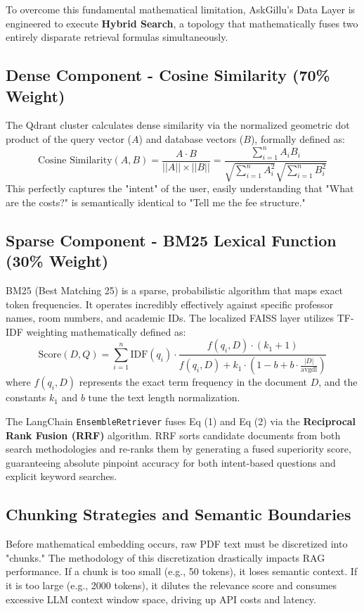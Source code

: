 \documentclass[12pt,a4paper]{report}
\begin{document}
To overcome this fundamental mathematical limitation, AskGillu's Data Layer is engineered to execute \textbf{Hybrid Search}, a topology that mathematically fuses two entirely disparate retrieval formulas simultaneously.

\subsection{Dense Component - Cosine Similarity (70\% Weight)}
The Qdrant cluster calculates dense similarity via the normalized geometric dot product of the query vector ($A$) and database vectors ($B$), formally defined as:
\begin{equation}
    \text{Cosine Similarity}(A, B) = \frac{A \cdot B}{||A|| \times ||B||} = \frac{\sum_{i=1}^{n} A_i B_i}{\sqrt{\sum_{i=1}^{n} A_i^2} \sqrt{\sum_{i=1}^{n} B_i^2}}
\end{equation}
This perfectly captures the "intent" of the user, easily understanding that "What are the costs?" is semantically identical to "Tell me the fee structure."

\subsection{Sparse Component - BM25 Lexical Function (30\% Weight)}
BM25 (Best Matching 25) is a sparse, probabilistic algorithm that maps exact token frequencies. It operates incredibly effectively against specific professor names, room numbers, and academic IDs. The localized FAISS layer utilizes TF-IDF weighting mathematically defined as:
\begin{equation}
    \text{Score}(D, Q) = \sum_{i=1}^{n} \text{IDF}(q_i) \cdot \frac{f(q_i, D) \cdot (k_1 + 1)}{f(q_i, D) + k_1 \cdot \left(1 - b + b \cdot \frac{|D|}{\text{avgdl}}\right)}
\end{equation}
where $f(q_i, D)$ represents the exact term frequency in the document $D$, and the constants $k_1$ and $b$ tune the text length normalization.

The LangChain \texttt{EnsembleRetriever} fuses Eq (1) and Eq (2) via the \textbf{Reciprocal Rank Fusion (RRF)} algorithm. RRF sorts candidate documents from both search methodologies and re-ranks them by generating a fused superiority score, guaranteeing absolute pinpoint accuracy for both intent-based questions and explicit keyword searches.

\subsection{Chunking Strategies and Semantic Boundaries}
Before mathematical embedding occurs, raw PDF text must be discretized into "chunks." The methodology of this discretization drastically impacts RAG performance. If a chunk is too small (e.g., 50 tokens), it loses semantic context. If it is too large (e.g., 2000 tokens), it dilutes the relevance score and consumes excessive LLM context window space, driving up API costs and latency.
\end{document}
